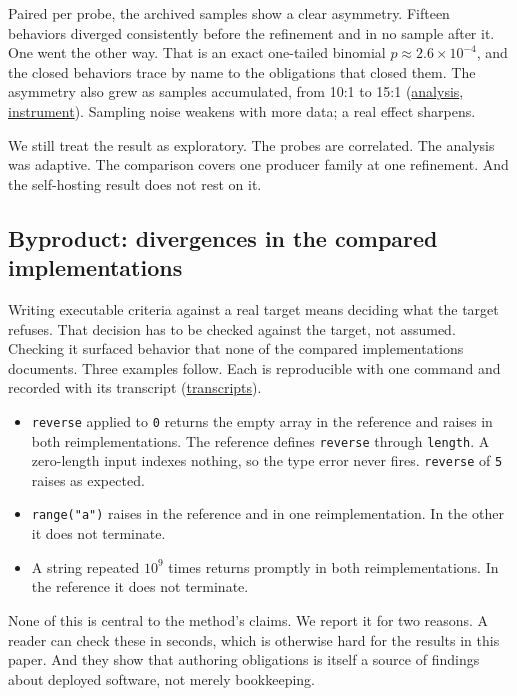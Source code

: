 \documentclass[10pt,twocolumn,letterpaper]{article}
\newcommand{\artifact}[2]{\href{https://github.com/rz4/reticuli/blob/5318acaac34ef99eeba9ff064a995a6313cc70ec/#1}{#2}}
\begin{document}
Paired per probe, the archived samples show a clear asymmetry. Fifteen behaviors diverged consistently before the refinement and in no sample after it. One went the other way. That is an exact one-tailed binomial $p\approx 2.6\times 10^{-4}$, and the closed behaviors trace by name to the obligations that closed them. The asymmetry also grew as samples accumulated, from 10:1 to 15:1 (\artifact{research/external/jq/rate-metric-findings.md}{analysis}, \artifact{research/external/jq/rate_metric.py}{instrument}). Sampling noise weakens with more data; a real effect sharpens.

We still treat the result as exploratory. The probes are correlated. The analysis was adaptive. The comparison covers one producer family at one refinement. And the self-hosting result does not rest on it.

\subsection{Byproduct: divergences in the compared implementations}
Writing executable criteria against a real target means deciding what the target refuses. That decision has to be checked against the target, not assumed. Checking it surfaced behavior that none of the compared implementations documents. Three examples follow. Each is reproducible with one command and recorded with its transcript (\artifact{research/external/jq/ecosystem-findings.md}{transcripts}).

\begin{itemize}\itemsep1pt\parskip0pt
\item \texttt{reverse} applied to \texttt{0} returns the empty array in the reference and raises in both reimplementations. The reference defines \texttt{reverse} through \texttt{length}. A zero-length input indexes nothing, so the type error never fires. \texttt{reverse} of \texttt{5} raises as expected.
\item \texttt{range("a")} raises in the reference and in one reimplementation. In the other it does not terminate.
\item A string repeated $10^9$ times returns promptly in both reimplementations. In the reference it does not terminate.
\end{itemize}

None of this is central to the method's claims. We report it for two reasons. A reader can check these in seconds, which is otherwise hard for the results in this paper. And they show that authoring obligations is itself a source of findings about deployed software, not merely bookkeeping.
\end{document}
